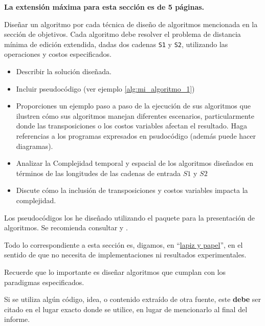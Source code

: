 \begin{mdframed}
    \textbf{La extensión máxima para esta sección es de 5 páginas.}
\end{mdframed}

Diseñar un algoritmo por cada técnica de diseño de algoritmos mencionada en la sección de objetivos. Cada algoritmo debe resolver el problema de distancia mínima de edición extendida, dadas dos cadenas \texttt{S1} y \texttt{S2}, utilizando las operaciones y costos especificados.

\begin{itemize}
    \item Describir la solución diseñada. 
    \item Incluir pseudocódigo (ver ejemplo \cref{alg:mi_algoritmo_1})
    \item Proporciones un ejemplo paso a paso de la ejecución de sus algoritmos que ilustren cómo sus algoritmos manejan diferentes escenarios, particularmente donde las
    transposiciones o los costos variables afectan el
    resultado. Haga referencias a los programas expresados en psudocódigo (además puede hacer diagramas).
    \item Analizar la Complejidad temporal y espacial de los algoritmos diseñados en términos de las longitudes de las cadenas de entrada $S1$ y $S2$
    \item Discute cómo la inclusión de transposiciones y costos   variables impacta la complejidad.
\end{itemize}

Los pseudocódigos los he diseñado utilizando el paquete  \cite{algorithm2e} para la presentación de algoritmos. Se recomienda consultar  \cite{ctan-algorithm2e} y  \cite{overleaf-algorithms}.

Todo lo correspondiente a esta sección es, digamos, en ``\href{https://dle.rae.es/metáfora}{lapiz y papel}'', en el sentido de que no necesita de implementaciones ni resultados experimentales. 

\begin{mdframed}
    Recuerde que lo importante es diseñar algoritmos que cumplan con los paradigmas especificados. 
\end{mdframed}

\begin{mdframed}
    Si se utiliza algún código, idea, o contenido extraído de otra fuente, este \textbf{debe} ser citado en el lugar exacto donde se utilice, en lugar de mencionarlo al final del informe. 
\end{mdframed}

